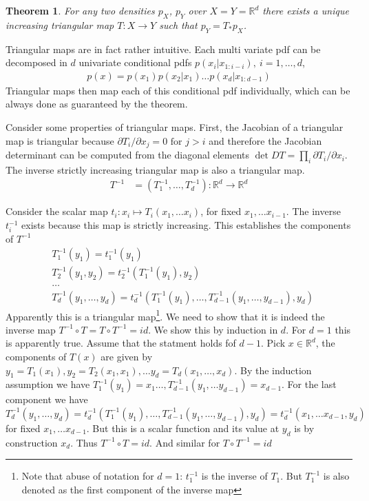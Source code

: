 \documentclass[12pt,a4paper]{article}
\newtheorem{theorem}{Theorem}
\begin{document}
\begin{theorem}{\cite{Bogachev_2005, jaini_polynomial_flow_2019}} \label{thm:bogachev}
	For any two densities $p_X$, $p_Y$ over $X=Y=\mathbb{R}^d$ there exists a unique increasing triangular map $T: X \rightarrow Y$ such that $p_Y = T_*p_X$.
\end{theorem}
Triangular maps are in fact rather intuitive. Each multi variate pdf can be decomposed in $d$ univariate conditional pdfs $p(x_i|x_{1:i-i}), ~ i=1,\dots,d$,
\begin{align}
	p(x) = p(x_1) p(x_2|x_1)\dots p(x_d|x_{1:d-1})
\end{align}
Triangular maps then map each of this conditional pdf individually, which can be always done as guaranteed by the theorem.

Consider some properties of triangular maps.
First, the Jacobian of a triangular map is triangular because $\partial T_i /\partial x_j = 0 \text{ for } j > i$ and therefore the Jacobian determinant can be computed from the diagonal elements $\det DT = \prod_i \partial T_i /\partial x_i$. 
The inverse strictly increasing triangular map is also a triangular map.
\begin{align}
	T^{-1} &= (T^{-1}_1, \dots, T^{-1}_d): \mathbb{R}^d  \rightarrow \mathbb{R}^d \label{eq_inv_triang}
\end{align}

Consider the  scalar map  $t_i :x_i \mapsto T_i(x_1, \dots x_i)$, for fixed $x_1, \dots x_{i-1}$. The inverse $t_i^{-1}$ exists because this map is strictly increasing. This establishes the components of $T^{-1}$
\begin{align}
	&T_1^{-1}(y_1) = t_1^{-1}(y_1) \nonumber \\ 
	&T_2^{-1}(y_1,y_2) = t_2^{-1}(T_1^{-1}(y_1),y_2) \nonumber \\
	&\dots \nonumber \\
	&T_d^{-1}(y_1,\dots, y_d) = t_d^{-1}(T_1^{-1}(y_1), \dots, T_{d-1}^{-1}(y_1, \dots,y_{d-1} ), y_d) \label{eq:inv_triang_rec}
\end{align}
Apparently this is a triangular map\footnote{Note that abuse of notation for $d=1$: $t_1^{-1}$ is the inverse of $T_1$. But $T^{-1}_1$ is also denoted as the first component of the inverse map}. We need to show that it is indeed the inverse map $T^{-1}\circ T = T\circ T^{-1} = id$. We show this by induction in $d$. For $d=1$ this is apparently true. Assume that the statment holds fof $d-1$. Pick $x \in \mathbb R^d$, the components of $T(x)$ are given by $y_1 = T_1(x_1), y_2 = T_2(x_1, x_1), \dots y_d = T_d(x_1, \dots, x_d)$. By the induction assumption
we have $T_1^{-1}(y_1)=x_1 \dots, T_{d-1}^{-1}(y_1, \dots y_{d-1})=x_{d-1}$.  For the last component we have $T_d^{-1}(y_1,\dots, y_d) = t_d^{-1}(T_1^{-1}(y_1), \dots, T_{d-1}^{-1}(y_1, \dots,y_{d-1} ), y_d) = t_d^{-1}(x_1, \dots x_{d-1}, y_d)$ for fixed $x_1, \dots x_{d-1}$.  But this is a scalar function and its value at $y_d$ is by construction $x_d$. Thus $T^{-1}\circ T = id$. And similar for $T\circ T^{-1}=id$
\end{document}
